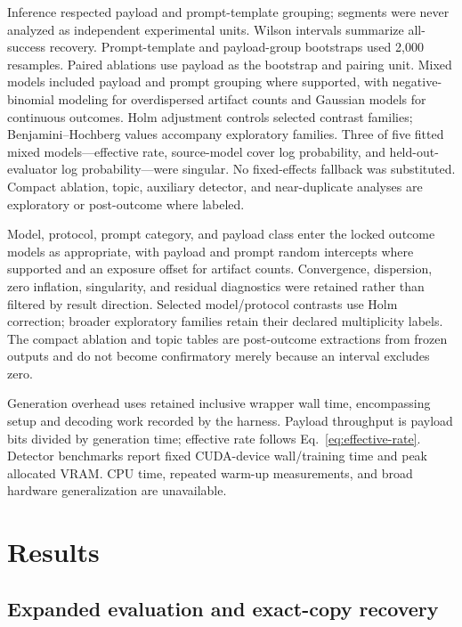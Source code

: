 \documentclass[fleqn,10pt]{wlscirep}
\begin{document}
Inference respected payload and prompt-template grouping; segments were never analyzed as independent experimental units. Wilson intervals summarize all-success recovery. Prompt-template and payload-group bootstraps used 2,000 resamples. Paired ablations use payload as the bootstrap and pairing unit. Mixed models included payload and prompt grouping where supported, with negative-binomial modeling for overdispersed artifact counts and Gaussian models for continuous outcomes\cite{Bates2015lme4,Brooks2017glmmTMB}. Holm adjustment controls selected contrast families; Benjamini--Hochberg values accompany exploratory families. Three of five fitted mixed models---effective rate, source-model cover log probability, and held-out-evaluator log probability---were singular. No fixed-effects fallback was substituted. Compact ablation, topic, auxiliary detector, and near-duplicate analyses are exploratory or post-outcome where labeled.

Model, protocol, prompt category, and payload class enter the locked outcome models as appropriate, with payload and prompt random intercepts where supported and an exposure offset for artifact counts. Convergence, dispersion, zero inflation, singularity, and residual diagnostics were retained rather than filtered by result direction. Selected model/protocol contrasts use Holm correction; broader exploratory families retain their declared multiplicity labels. The compact ablation and topic tables are post-outcome extractions from frozen outputs and do not become confirmatory merely because an interval excludes zero.

Generation overhead uses retained inclusive wrapper wall time, encompassing setup and decoding work recorded by the harness. Payload throughput is payload bits divided by generation time; effective rate follows Eq.~\ref{eq:effective-rate}. Detector benchmarks report fixed CUDA-device wall/training time and peak allocated VRAM. CPU time, repeated warm-up measurements, and broad hardware generalization are unavailable.


\section*{Results}\label{sec:results}

\subsection*{Expanded evaluation and exact-copy recovery}\label{sec:results-recovery}
\end{document}
